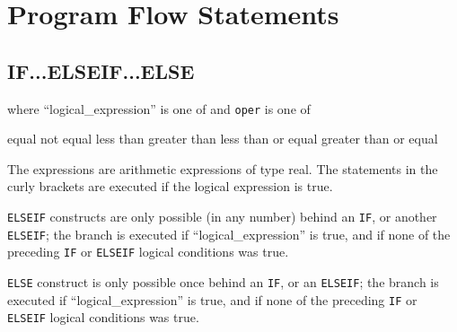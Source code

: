 
\chapter{Program Flow Statements}

 




\section{IF...ELSEIF...ELSE}
\label{sec:if}


where ``logical\_expression'' is one of 
and \texttt{oper} is one of 
\begin{madlist}
\ttitem{==}  equal
\ttitem{<>}  not equal
\ttitem{<}  less than
\ttitem{>}  greater than
\ttitem{<=}  less than or equal
\ttitem{>=}  greater than or equal
\end{madlist}

The expressions are arithmetic expressions of type real. The statements
in the curly brackets are executed if the logical expression is true.  

\texttt{ELSEIF} constructs are only possible (in any number) behind an
\texttt{IF}, or another \texttt{ELSEIF}; the branch is executed if
``logical\_expression'' is true, and if none of the preceding \texttt{IF}
or \texttt{ELSEIF} logical conditions was true.   


\texttt{ELSE} construct is only possible once behind an \texttt{IF}, or
an \texttt{ELSEIF}; the branch is executed if ``logical\_expression'' is
true, and if none of the preceding \texttt{IF} or \texttt{ELSEIF}
logical conditions was true.   


